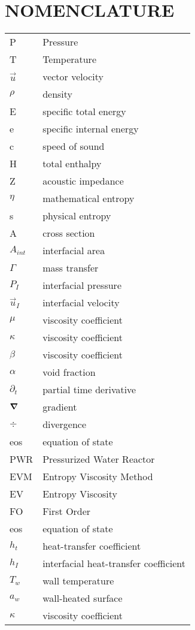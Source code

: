 %
%
%


\chapter*{NOMENCLATURE}

\begin{longtable}{l l }
P & Pressure\tabularnewline
T & Temperature\tabularnewline
$\vec{u}$ & vector velocity \tabularnewline
$\rho$ & density \tabularnewline
E & specific total energy \tabularnewline
e & specific internal energy \tabularnewline
c & speed of sound \tabularnewline
H & total enthalpy \tabularnewline
Z & acoustic impedance \tabularnewline
$\eta$ & mathematical entropy \tabularnewline
s & physical entropy \tabularnewline
A & cross section \tabularnewline
$A_{int}$ & interfacial area \tabularnewline
$\Gamma$ & mass transfer \tabularnewline
$P_I$ & interfacial pressure \tabularnewline
$\vec{u}_I$ & interfacial velocity \tabularnewline
$\mu$ & viscosity coefficient \tabularnewline
$\kappa$ & viscosity coefficient \tabularnewline
$\beta$ & viscosity coefficient \tabularnewline
$\alpha$ & void fraction \tabularnewline
$\partial_t$ & partial time derivative \tabularnewline
$\boldsymbol{\nabla}$ & gradient \tabularnewline
$\div$ & divergence \tabularnewline
eos & equation of state \tabularnewline
PWR & Pressurized Water Reactor \tabularnewline
EVM & Entropy Viscosity Method \tabularnewline
EV & Entropy Viscosity\tabularnewline
FO & First Order \tabularnewline
eos & equation of state \tabularnewline
$h_t$ &  heat-transfer coefficient\tabularnewline
$h_I$ & interfacial heat-transfer coefficient \tabularnewline
$T_w$ & wall temperature \tabularnewline
$a_w$ & wall-heated surface \tabularnewline
$\kappa$ & viscosity coefficient \tabularnewline
\end{longtable}

\vspace{2em}
\pagebreak{}
